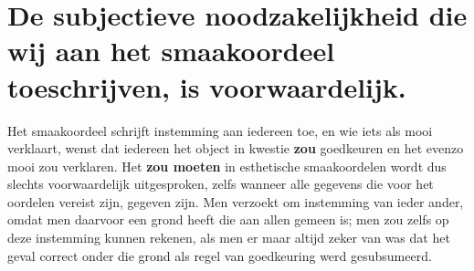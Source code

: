 \section{De subjectieve noodzakelijkheid die wij aan het smaakoordeel toeschrijven, is voorwaardelijk.} %

Het smaakoordeel schrijft instemming aan iedereen toe, en wie iets als mooi verklaart, wenst dat iedereen het object in kwestie \textbf{zou} goedkeuren en het evenzo mooi zou verklaren. Het \textbf{zou moeten} in esthetische smaakoordelen wordt dus slechts voorwaardelijk uitgesproken, zelfs wanneer alle gegevens die voor het oordelen vereist zijn, gegeven zijn. Men verzoekt om instemming van ieder ander, omdat men daarvoor een grond heeft die aan allen gemeen is; men zou zelfs op deze instemming kunnen rekenen, als men er maar altijd zeker van was dat het geval correct onder die grond als regel van goedkeuring werd gesubsumeerd.

